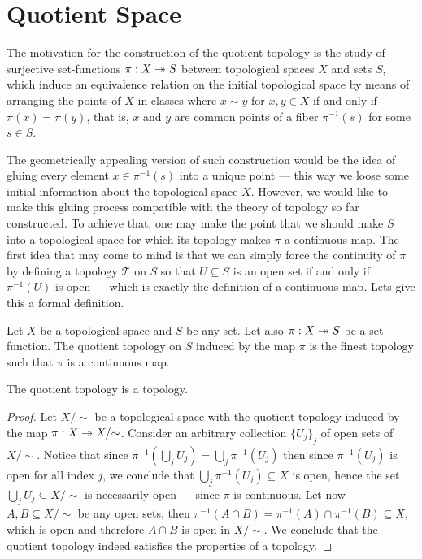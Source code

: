 \section{Quotient Space}

The motivation for the construction of the quotient topology is the study of
surjective set-functions \(\pi: X \twoheadrightarrow S\) between topological spaces \(X\) and
sets \(S\), which induce an equivalence relation on the initial topological
space by means of arranging the points of \(X\) in classes where \(x \sim y\) for
\(x, y \in X\) if and only if \(\pi(x) = \pi(y)\), that is, \(x\) and \(y\) are common
points of a fiber \(\pi^{-1}(s)\) for some \(s \in S\).

The geometrically appealing version of such construction would be the idea of
gluing every element \(x \in \pi^{-1}(s)\) into a unique point --- this way we loose
some initial information about the topological space \(X\). However, we would
like to make this gluing process compatible with the theory of topology so far
constructed. To achieve that, one may make the point that we should make \(S\)
into a topological space for which its topology makes \(\pi\) a continuous
map. The first idea that may come to mind is that we can simply force the
continuity of \(\pi\) by defining a topology \(\mathcal T\) on \(S\) so that \(U \subseteq
S\) is an open set if and only if \(\pi^{-1}(U)\) is open --- which is exactly the
definition of a continuous map. Lets give this a formal definition.

\begin{definition}\label{def:quotient-topology}
Let \(X\) be a topological space and \(S\) be any set. Let also \(\pi: X \twoheadrightarrow S\)
be a set-function. The quotient topology on \(S\) induced by the map \(\pi\) is
the finest topology such that \(\pi\) is a continuous map.
\end{definition}

\begin{proposition}
The quotient topology is a topology.
\end{proposition}

\begin{proof}
Let \(X /{\sim}\) be a topological space with the quotient topology induced by the
map \(\pi: X \twoheadrightarrow X /{\sim}\). Consider an arbitrary collection \({\{U_{j}\}}_j\) of
open sets of \(X /{\sim}\). Notice that since \(\pi^{-1}(\bigcup_{j} U_{j}) = \bigcup_j
\pi^{-1}(U_j)\) then since \(\pi^{-1}(U_j)\) is open for all index \(j\), we
conclude that \(\bigcup_j \pi^{-1}(U_{j}) \subseteq X\) is open, hence the set \(\bigcup_j U_j \subseteq X
/{\sim}\) is necessarily open --- since \(\pi\) is continuous. Let now \(A, B \subseteq X
/{\sim}\) be any open sets, then \(\pi^{-1}(A \cap B) = \pi^{-1}(A) \cap \pi^{-1}(B) \subseteq X\),
which is open and therefore \(A \cap B\) is open in \(X /{\sim}\). We conclude that
the quotient topology indeed satisfies the properties of a topology.
\end{proof}

